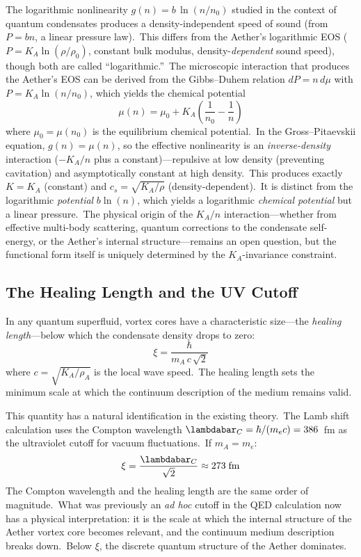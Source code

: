 ﻿\documentclass[12pt,letterpaper]{article}
\newcommand{\rhoa}{\rho_{\!A}}
\newcommand{\Ka}{K_{\!A}}
\begin{document}
The logarithmic nonlinearity $g(n) = b\,\ln(n/n_0)$ studied in the context
of quantum condensates \cite{rosen1969,zloshchastiev2011} produces a
density-independent speed of sound (from $P = bn$, a linear pressure law).\
This differs from the Aether's logarithmic EOS ($P = \Ka\ln(\rho/\rho_0)$,
constant bulk modulus, density-\emph{dependent} sound speed), though both
are called ``logarithmic.''\ The microscopic interaction that produces
the Aether's EOS can be derived from the Gibbs--Duhem relation
$dP = n\,d\mu$ with $P = \Ka\ln(n/n_0)$, which yields the chemical
potential
%
\begin{equation}\label{eq:gp-nonlinearity}
  \mu(n) = \mu_0 + \Ka\!\left(\frac{1}{n_0} - \frac{1}{n}\right)
\end{equation}
%
where $\mu_0 = \mu(n_0)$ is the equilibrium chemical potential.\ In the
Gross--Pitaevskii equation, $g(n) = \mu(n)$, so the effective nonlinearity
is an \emph{inverse-density} interaction ($-\Ka/n$ plus a constant)---repulsive
at low density (preventing cavitation) and asymptotically constant at high
density.\ This produces exactly $K = \Ka$ (constant) and
$c_s = \sqrt{\Ka/\rho}$ (density-dependent).\
It is distinct from the logarithmic \emph{potential} $b\ln(n)$, which
yields a logarithmic \emph{chemical potential} but a linear pressure.\
The physical origin of the $\Ka/n$ interaction---whether from
effective multi-body scattering, quantum corrections to the condensate
self-energy, or the Aether's internal structure---remains an open question,
but the functional form itself is uniquely determined by the
$\Ka$-invariance constraint.


\subsection{The Healing Length and the UV Cutoff}

In any quantum superfluid, vortex cores have a characteristic size---the
\emph{healing length}---below which the condensate density drops to zero:
%
\begin{equation}
  \xi = \frac{\hbar}{m_A\, c\, \sqrt{2}}
\end{equation}
%
where $c = \sqrt{\Ka/\rhoa}$ is the local wave speed.\ The healing length sets the
minimum scale at which the continuum description of the medium remains valid.

This quantity has a natural identification in the existing theory.\ The Lamb
shift calculation uses the Compton wavelength $\lambdabar_C = \hbar/(m_e c) =
386$~fm as the ultraviolet cutoff for vacuum fluctuations.\ If $m_A = m_e$:
%
\begin{equation}
  \xi = \frac{\lambdabar_C}{\sqrt{2}} \approx 273\;\text{fm}
\end{equation}
%
The Compton wavelength and the healing length are the same order of magnitude.\
What was previously an \emph{ad hoc} cutoff in the QED calculation now has a
physical interpretation: it is the scale at which the internal structure of the
Aether vortex core becomes relevant, and the continuum medium description breaks
down.\ Below $\xi$, the discrete quantum structure of the Aether dominates.
\end{document}
